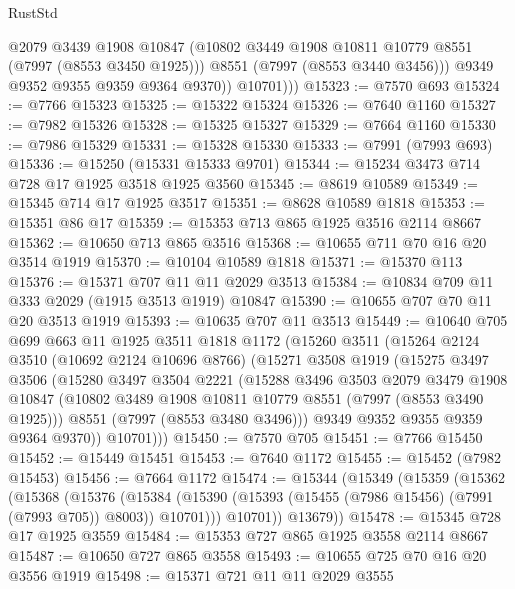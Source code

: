 \begin{lexlean}{RustStd}
\begin{coremodule}
                @2079
                @3439
                @1908
                @10847
                (@10802 @3449 @1908 @10811 @10779 @8551 (@7997 (@8553 @3450 @1925)))
                @8551
                (@7997 (@8553 @3440 @3456)))
              @9349
              @9352
              @9355
              @9359
              @9364
              @9370))
          @10701)))
@15323 := @7570 @693
@15324 := @7766 @15323
@15325 := @15322 @15324
@15326 := @7640 @1160
@15327 := @7982 @15326
@15328 := @15325 @15327
@15329 := @7664 @1160
@15330 := @7986 @15329
@15331 := @15328 @15330
@15333 := @7991 (@7993 @693)
@15336 := @15250 (@15331 @15333 @9701)
@15344 := @15234 @3473 @714 @728 @17 @1925 @3518 @1925 @3560
@15345 := @8619 @10589
@15349 := @15345 @714 @17 @1925 @3517
@15351 := @8628 @10589 @1818
@15353 := @15351 @86 @17
@15359 := @15353 @713 @865 @1925 @3516 @2114 @8667
@15362 := @10650 @713 @865 @3516
@15368 := @10655 @711 @70 @16 @20 @3514 @1919
@15370 := @10104 @10589 @1818
@15371 := @15370 @113
@15376 := @15371 @707 @11 @11 @2029 @3513
@15384 := @10834 @709 @11 @333 @2029 (@1915 @3513 @1919) @10847
@15390 := @10655 @707 @70 @11 @20 @3513 @1919
@15393 := @10635 @707 @11 @3513
@15449 := @10640
    @705
    @699
    @663
    @11
    @1925
    @3511
    @1818
    @1172
    (@15260
      @3511
      (@15264
        @2124
        @3510
        (@10692 @2124 @10696 @8766)
        (@15271
          @3508
          @1919
          (@15275
            @3497
            @3506
            (@15280
              @3497
              @3504
              @2221
              (@15288
                @3496
                @3503
                @2079
                @3479
                @1908
                @10847
                (@10802 @3489 @1908 @10811 @10779 @8551 (@7997 (@8553 @3490 @1925)))
                @8551
                (@7997 (@8553 @3480 @3496)))
              @9349
              @9352
              @9355
              @9359
              @9364
              @9370))
          @10701)))
@15450 := @7570 @705
@15451 := @7766 @15450
@15452 := @15449 @15451
@15453 := @7640 @1172
@15455 := @15452 (@7982 @15453)
@15456 := @7664 @1172
@15474 := @15344
    (@15349
      (@15359
        (@15362
          (@15368
            (@15376
              (@15384 (@15390 (@15393 (@15455 (@7986 @15456) (@7991 (@7993 @705)) @8003)) @10701)))
            @10701))
        @13679))
@15478 := @15345 @728 @17 @1925 @3559
@15484 := @15353 @727 @865 @1925 @3558 @2114 @8667
@15487 := @10650 @727 @865 @3558
@15493 := @10655 @725 @70 @16 @20 @3556 @1919
@15498 := @15371 @721 @11 @11 @2029 @3555

\end{coremodule}
\end{lexlean}
